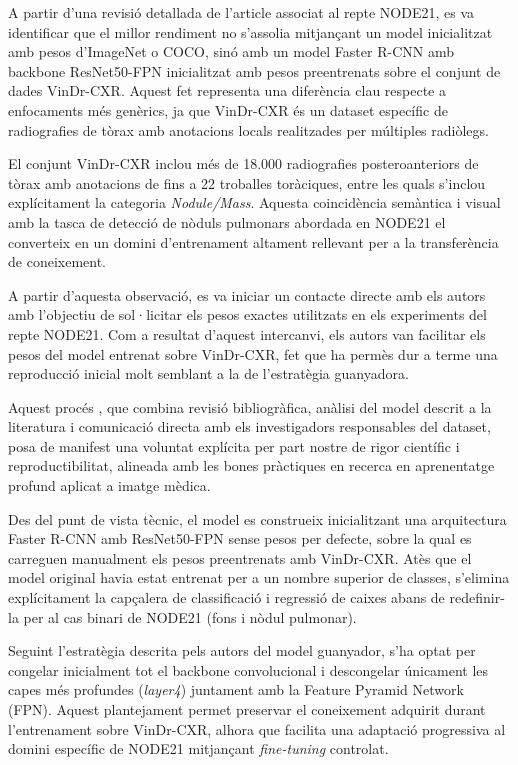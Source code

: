 \documentclass[conference]{IEEEtran}
\begin{document}
A partir d’una revisió detallada de l’article associat al repte NODE21, es va identificar
que el millor rendiment no s’assolia mitjançant un model inicialitzat amb pesos d’ImageNet
o COCO, sinó amb un model Faster R-CNN amb backbone ResNet50-FPN inicialitzat amb
pesos preentrenats sobre el conjunt de dades VinDr-CXR. Aquest fet representa una diferència
clau respecte a enfocaments més genèrics, ja que VinDr-CXR és un dataset específic de
radiografies de tòrax amb anotacions locals realitzades per múltiples radiòlegs.

El conjunt VinDr-CXR inclou més de 18.000 radiografies posteroanteriors de tòrax amb
anotacions de fins a 22 troballes toràciques, entre les quals s’inclou explícitament la
categoria \textit{Nodule/Mass}. Aquesta coincidència semàntica i visual amb la tasca de
detecció de nòduls pulmonars abordada en NODE21 el converteix en un domini d’entrenament
altament rellevant per a la transferència de coneixement.

A partir d’aquesta observació, es va iniciar un contacte directe amb els
autors amb l’objectiu de sol·licitar els pesos exactes utilitzats en els experiments del repte
NODE21. Com a resultat d’aquest intercanvi, els autors van facilitar els pesos del model
entrenat sobre VinDr-CXR, fet que ha permès dur a terme una reproducció inicial molt semblant a la de
l’estratègia guanyadora.

Aquest procés , que combina revisió bibliogràfica, anàlisi del model descrit a la
literatura i comunicació directa amb els investigadors responsables del dataset, posa
de manifest una voluntat explícita per part nostre de rigor científic i reproductibilitat, alineada amb
les bones pràctiques en recerca en aprenentatge profund aplicat a imatge mèdica.

Des del punt de vista tècnic, el model es construeix inicialitzant una arquitectura
Faster R-CNN amb ResNet50-FPN sense pesos per defecte, sobre la qual es carreguen
manualment els pesos preentrenats amb VinDr-CXR. Atès que el model original havia estat
entrenat per a un nombre superior de classes, s’elimina explícitament la capçalera de
classificació i regressió de caixes abans de redefinir-la per al cas binari de NODE21
(fons i nòdul pulmonar).

Seguint l’estratègia descrita pels autors del model guanyador, s’ha optat per congelar
inicialment tot el backbone convolucional i descongelar únicament les capes més profundes
(\textit{layer4}) juntament amb la Feature Pyramid Network (FPN). Aquest plantejament
permet preservar el coneixement adquirit durant l’entrenament sobre VinDr-CXR, alhora
que facilita una adaptació progressiva al domini específic de NODE21 mitjançant
\textit{fine-tuning} controlat.
\end{document}
